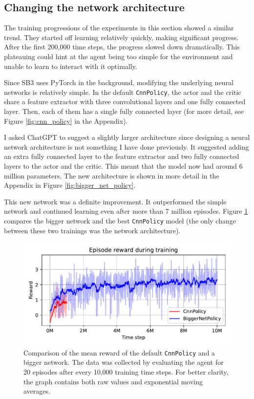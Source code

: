 \documentclass[
  digital,     %
  oneside,     %
  nosansbold,  %
  nocolorbold, %
  lof,         %
  lot,         %
]{fithesis4}
\begin{document}
\subsection{Changing the network architecture}
\label{subsec:arch_change}

The training progressions of the experiments in this section showed a similar trend. They started off learning relatively quickly, making significant progress. After the first 200,000 time steps, the progress slowed down dramatically. This plateauing could hint at the agent being too simple for the environment and unable to learn to interact with it optimally.

Since SB3 uses PyTorch in the background, modifying the underlying neural networks is relatively simple. In the default \texttt{CnnPolicy}, the actor and the critic share a feature extractor with three convolutional layers and one fully connected layer. Then, each of them has a single fully connected layer (for more detail, see Figure \ref{fig:cnn_policy} in the Appendix).

I asked ChatGPT to suggest a slightly larger architecture since designing a neural network architecture is not something I have done previously. It suggested adding an extra fully connected layer to the feature extractor and two fully connected layers to the actor and the critic. This meant that the model now had around 6 million parameters. The new architecture is shown in more detail in the Appendix in Figure \ref{fig:bigger_net_policy}.

This new network was a definite improvement. It outperformed the simple network and continued learning even after more than 7 million episodes. Figure \ref{fig:v3_bigger_net} compares the bigger network and the best \texttt{CnnPolicy} model (the only change between these two trainings was the network architecture).

\begin{figure}
    \includegraphics[width=1\linewidth]{graphs/v3_cnn_vs_biggernet.pdf}
    \caption{Comparison of the mean reward of the default \texttt{CnnPolicy} and a bigger network. The data was collected by evaluating the agent for 20 episodes after every 10,000 training time steps. For better clarity, the graph contains both raw values and exponential moving averages.}
    \label{fig:v3_bigger_net}
\end{figure}
\end{document}
